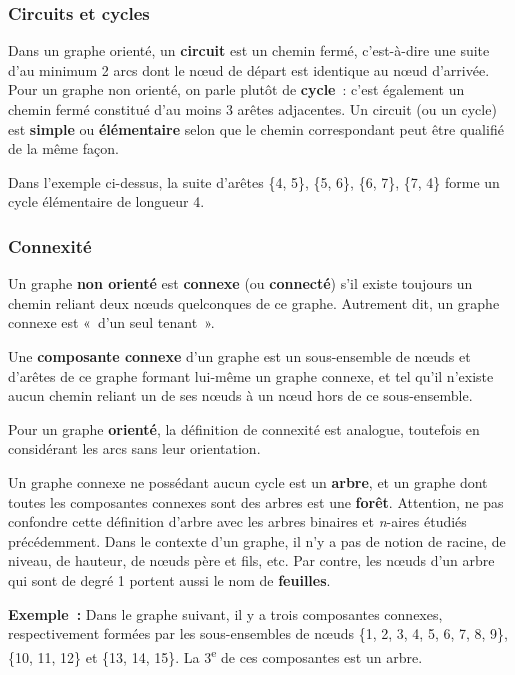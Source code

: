 		\subsubsection{Circuits et cycles}
			
			Dans un graphe orienté, un \textbf{circuit} est un chemin fermé, 
			c'est-à-dire une suite d'au minimum 2 arcs dont le n{\oe}ud de 
			départ est identique au n{\oe}ud d'arrivée. Pour un graphe non 
			orienté, on parle plutôt de \textbf{cycle}~:
			c'est également un chemin fermé constitué d'au moins 3 arêtes 
			adjacentes. Un circuit (ou un cycle) est \textbf{simple}
			ou \textbf{élémentaire} selon que le chemin correspondant 
			peut être qualifié de la même façon.

			Dans l'exemple ci-dessus, la suite d'arêtes 
			\{4, 5\}, \{5, 6\}, \{6, 7\}, \{7, 4\} 
			forme un cycle élémentaire de	longueur 4.

		\subsubsection{Connexité}
		
		Un graphe \textbf{non orienté} est \textbf{connexe} 
		(ou \textbf{connecté}) s'il existe toujours un chemin 
		reliant deux n{\oe}uds quelconques de ce graphe. 
		Autrement dit, un graphe connexe est «~d'un seul tenant~».

		Une \textbf{composante connexe} d'un graphe est un sous-ensemble 
		de n{\oe}uds et d'arêtes de ce graphe formant lui-même
		un graphe connexe, et tel qu'il n'existe aucun chemin reliant 
		un de ses n{\oe}uds à un n{\oe}ud hors de ce sous-ensemble.

		Pour un graphe \textbf{orienté}, la définition de connexité est 
		analogue, toutefois en considérant les arcs sans leur orientation.

		Un graphe connexe ne possédant aucun cycle est un \textbf{arbre}, 
		et un graphe dont toutes les composantes connexes sont des arbres 
		est une \textbf{forêt}. Attention, ne pas confondre cette 
		définition d'arbre avec les arbres binaires et \textit{n}-aires 
		étudiés précédemment. Dans le contexte d'un graphe, il n'y a pas 
		de notion de racine, de niveau, de hauteur, de n{\oe}uds père et fils, etc. 
		Par contre, les n{\oe}uds d'un arbre qui sont de degré 1 portent aussi le
		nom de \textbf{feuilles}.

		\textbf{Exemple~:} Dans le graphe suivant, il y a trois composantes 
		connexes, respectivement formées par les sous-ensembles de n{\oe}uds 
		\{1, 2, 3, 4, 5, 6, 7, 8, 9\}, \{10, 11, 12\} et \{13, 14, 15\}. 
		La 3\textsuperscript{e} de ces composantes est un arbre.

